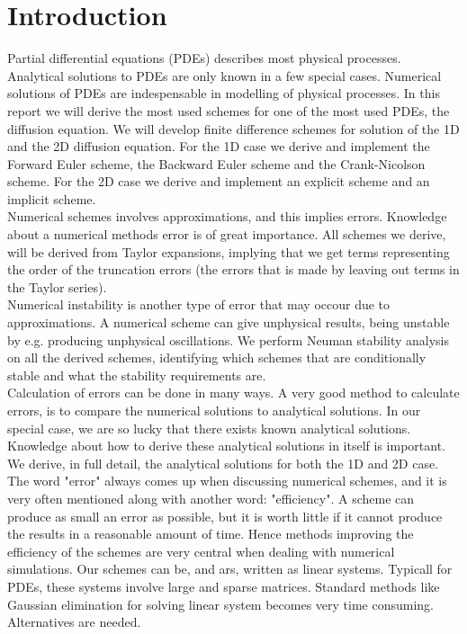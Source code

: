 \documentclass{article}
\begin{document}
\section{Introduction}
Partial differential equations (PDEs) describes most physical processes. Analytical solutions to PDEs are only known in a few special cases. Numerical solutions of PDEs are indespensable in modelling of physical processes. In this report we will derive the most used schemes for one of the most used PDEs, the diffusion equation. We will develop finite difference schemes for solution of the 1D and the 2D diffusion equation. For the 1D case we derive and implement the Forward Euler scheme, the Backward Euler scheme and the Crank-Nicolson scheme. For the 2D case we derive and implement an explicit scheme and an implicit scheme.\\

Numerical schemes involves approximations, and this implies errors. Knowledge about a numerical methods error is of great importance. All schemes we derive, will be derived from Taylor expansions, implying that we get terms representing the order of the truncation errors (the errors that is made by leaving out terms in the Taylor series). \\

Numerical instability is another type of error that may occour due to approximations. A numerical scheme can give unphysical results, being unstable by e.g. producing unphysical oscillations. We perform Neuman stability analysis on all the derived schemes, identifying which schemes that are conditionally stable and what the stability requirements are.\\

Calculation of errors can be done in many ways. A very good method to calculate errors, is to compare the numerical solutions to analytical solutions. In our special case, we are so lucky that there exists known analytical solutions. Knowledge about how to derive these analytical solutions in itself is important. We derive, in full detail, the analytical solutions for both the 1D and 2D case.\\

The word "error" always comes up when discussing numerical schemes, and it is very often mentioned along with another word: "efficiency". A scheme can produce as small an error as possible, but it is worth little if it cannot produce the results in a reasonable amount of time. Hence methods improving the efficiency of the schemes are very central when dealing with numerical simulations. Our schemes can be, and ars, written as linear systems. Typicall for PDEs, these systems involve large and sparse matrices. Standard methods like Gaussian elimination for solving linear system becomes very time consuming. Alternatives are needed. \\
\end{document}
